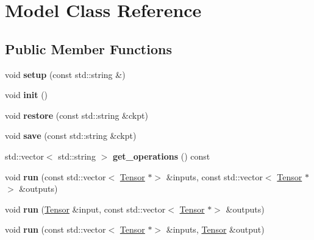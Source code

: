 \hypertarget{classModel}{}\section{Model Class Reference}
\label{classModel}
\subsection*{Public Member Functions}
\begin{DoxyCompactItemize}
\item 
\mbox{\label{classModel_aa2af91a5b73badb54bcc0ebc03701c8b}} 
void {\bfseries setup} (const std\+::string \&)
\item 
\mbox{\label{classModel_a457ca5a6a659cbf6770231c98f2ef760}} 
void {\bfseries init} ()
\item 
\mbox{\label{classModel_a842ad97f00f366c336cb0df046947522}} 
void {\bfseries restore} (const std\+::string \&ckpt)
\item 
\mbox{\label{classModel_ab22d9a71d4974f2c32df04d4c2a79fc0}} 
void {\bfseries save} (const std\+::string \&ckpt)
\item 
\mbox{\label{classModel_ac7f342a6c0259300dcc3fee38992cc2c}} 
std\+::vector$<$ std\+::string $>$ {\bfseries get\+\_\+operations} () const
\item 
\mbox{\label{classModel_a3b726c2045f3fa714d8d144bf6ea8962}} 
void {\bfseries run} (const std\+::vector$<$ \hyperlink{classTensor}{Tensor} $\ast$$>$ \&inputs, const std\+::vector$<$ \hyperlink{classTensor}{Tensor} $\ast$$>$ \&outputs)
\item 
\mbox{\label{classModel_a117a9d162873b0cce3fdebf2eea2fff9}} 
void {\bfseries run} (\hyperlink{classTensor}{Tensor} \&input, const std\+::vector$<$ \hyperlink{classTensor}{Tensor} $\ast$$>$ \&outputs)
\item 
\mbox{\label{classModel_abf62da8432a26ac701101e0a1417c80b}} 
void {\bfseries run} (const std\+::vector$<$ \hyperlink{classTensor}{Tensor} $\ast$$>$ \&inputs, \hyperlink{classTensor}{Tensor} \&output)
\item 

\end{DoxyCompactItemize}
